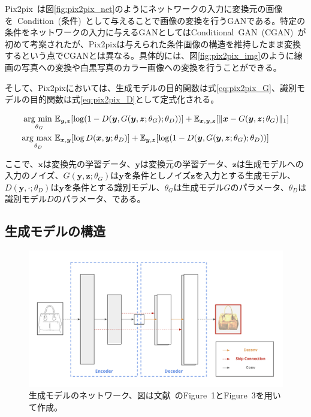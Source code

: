 Pix2pix~\cite{pix2pix}は図\ref{fig:pix2pix_net}のようにネットワークの入力に変換元の画像を~Condition~(条件)~として与えることで画像の変換を行うGANである。特定の条件をネットワークの入力に与えるGANとしてはConditional~GAN~(CGAN)~\cite{CGAN}が初めて考案されたが、Pix2pixは与えられた条件画像の構造を維持したまま変換するという点でCGANとは異なる。具体的には、図\ref{fig:pix2pix_img}のように線画の写真への変換や白黒写真のカラー画像への変換を行うことができる。

そして、Pix2pixにおいては、生成モデルの目的関数は式\ref{eq:pix2pix_G}、識別モデルの目的関数は式\ref{eq:pix2pix_D}として定式化される。

\begin{align}
    \label{eq:pix2pix_G}
    \mathop{\rm arg~min~}\limits _{\theta_G}& \mathbb{E}_{\boldsymbol{y}, \boldsymbol{z}}[\log (1-D(\boldsymbol{y}, G(\boldsymbol{y}, \boldsymbol{z}; \theta_G); \theta_D))]+\mathbb{E}_{\boldsymbol{x}, \boldsymbol{y}, \boldsymbol{z}}[\|\boldsymbol{x}-G(\boldsymbol{y}, \boldsymbol{z}; \theta_G)\|_{1}]\\
    \label{eq:pix2pix_D}
    \mathop{\rm arg~max~}\limits _{\theta_D}& \mathbb{E}_{\boldsymbol{x}, \boldsymbol{y}}[\log D(\boldsymbol{x}, \boldsymbol{y}; \theta_D)]+\mathbb{E}_{\boldsymbol{y}, \boldsymbol{z}}[\log (1-D(\boldsymbol{y}, G(\boldsymbol{y}, \boldsymbol{z}; \theta_G); \theta_D))]
\end{align}

ここで、$\boldsymbol{x}$は変換先の学習データ、$\boldsymbol{y}$は変換元の学習データ、$\boldsymbol{z}$は生成モデルへの入力のノイズ、$G(\boldsymbol{y},\boldsymbol{z};\theta_G)$は$\boldsymbol{y}$を条件としノイズ$\boldsymbol{z}$を入力とする生成モデル、$D(\boldsymbol{y},\cdot;\theta_D)$は$\boldsymbol{y}$を条件とする識別モデル、$\theta_G$は生成モデル$G$のパラメータ、$\theta_D$は識別モデル$D$のパラメータ、である。

\subsection{生成モデルの構造}

\begin{figure}[t]
\begin{center}
\includegraphics[width=\hsize]{figure/u-net.png}
\caption{生成モデルのネットワーク、図は文献~\cite{pix2pix}のFigure~1とFigure~3を用いて作成。}
\label{fig:u-net}
\end{center}
\end{figure}

